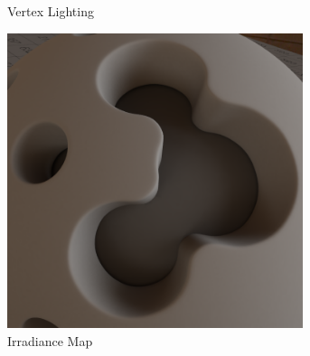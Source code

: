 \begin{figure}[h]
\begin{subfigure}[t]{0.33\textwidth}
			\caption{Vertex Lighting}
		\end{subfigure}
		\begin{subfigure}[t]{0.33\textwidth}
			\center
			\includegraphics[width=0.95\textwidth]{pic/irrmap-shaderball_e3-irrmap.png}
			\caption{Irradiance Map}
		\end{subfigure}
		\caption{}
	\end{figure}

